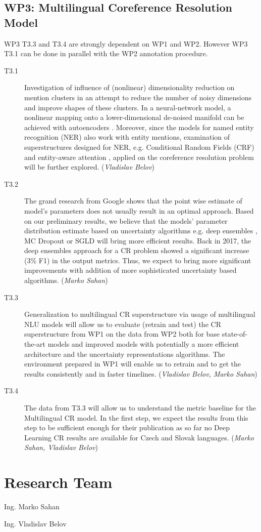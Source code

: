 \subsection*{WP3: Multilingual Coreference Resolution Model}

WP3 T3.3 and T3.4  are strongly dependent on WP1 and WP2. However WP3 T3.1 can be done in parallel with the WP2 annotation procedure.

\begin{description}
	\item [T3.1] Investigation of influence of (nonlinear) dimensionality reduction on mention clusters in an attempt to reduce the number of noisy dimensions and improve shapes of these clusters. In a neural-network model, a nonlinear mapping onto a lower-dimensional de-noised manifold can be achieved with autoencoders \cite{autoencoders-Zabalza2016,autoencoders-Sahay2019}. Moreover, since the models for named entity recognition (NER) also work with entity mentions, examination of superstructures designed for NER, e.g. Conditional Random Fields (CRF) \cite{ner-Strakova2019,ner-Zhanming2019} and entity-aware attention \cite{ner-Yamada2020}, applied on the coreference resolution problem will be further explored. (\textit{Vladislav Belov})
	\item [T3.2] The grand research from Google \cite{ovadia2019can} shows that the point wise estimate of model’s parameters does not usually result in an optimal approach. Based on our preliminary results, we believe that the models’ parameter distribution estimate based on uncertainty algorithms e.g. deep ensembles \cite{lakshminarayanan2016simple}, MC Dropout \cite{gal2017deep} or SGLD \cite{welling2011bayesian} will bring more efficient results. Back in 2017, the deep ensembles approach for a CR problem \cite{cr-Lee17} showed a significant increase (3\% F1) in the output metrics. Thus, we expect to bring more significant improvements with addition of more sophisticated uncertainty based algorithms. (\textit{Marko Sahan})
	\item [T3.3] Generalization to multilingual CR superstructure via usage of multilingual NLU models will allow us to evaluate (retrain and test) the CR superstructure from WP1 on the data from WP2 both for base state-of-the-art models and improved models with potentially a more efficient architecture and the uncertainty representations algorithms. The environment prepared in WP1 will enable us to retrain and to get the results consistently and in faster timelines. (\textit{Vladislav Belov, Marko Sahan})	
	\item  [T3.4] The data from T3.3 will allow us to understand the metric baseline for the Multilingual CR model. In the first step, we expect the results from this step to be sufficient enough for their publication as so far no Deep Learning CR results are available for Czech and Slovak languages. (\textit{Marko Sahan, Vladislav Belov})

\end{description}


\section{Research Team}\label{sec:research_team}
\begin{description}
	\item Ing. Marko Sahan
	\item Ing. Vladislav Belov
\end{description}
